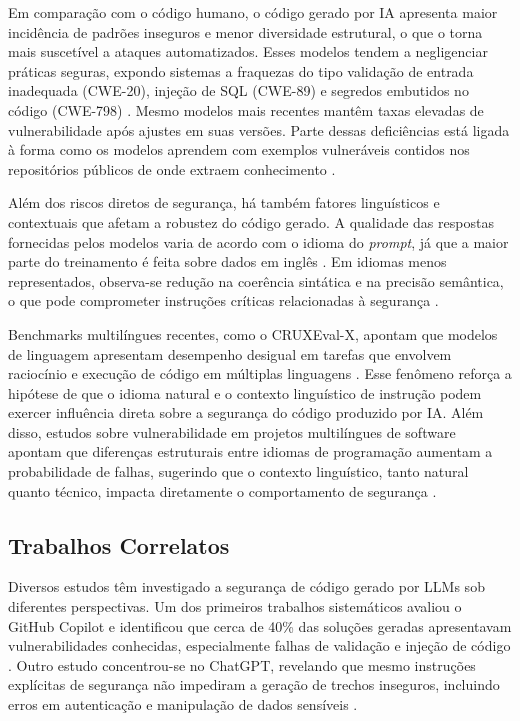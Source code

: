 \documentclass[12pt]{article}
\begin{document}
Em comparação com o código humano, o código gerado por IA apresenta maior incidência de padrões inseguros e menor diversidade estrutural, o que o torna mais suscetível a ataques automatizados. Esses modelos tendem a negligenciar práticas seguras, expondo sistemas a fraquezas do tipo validação de entrada inadequada (CWE-20), injeção de SQL (CWE-89) e segredos embutidos no código (CWE-798) \cite{cotroneo2025humanwrittenvsaigeneratedcode}. Mesmo modelos mais recentes mantêm taxas elevadas de vulnerabilidade após ajustes em suas versões. Parte dessas deficiências está ligada à forma como os modelos aprendem com exemplos vulneráveis contidos nos repositórios públicos de onde extraem conhecimento \cite{dora2025hiddenrisksllmgeneratedweb}.

Além dos riscos diretos de segurança, há também fatores linguísticos e contextuais que afetam a robustez do código gerado. A qualidade das respostas fornecidas pelos modelos varia de acordo com o idioma do \textit{prompt}, já que a maior parte do treinamento é feita sobre dados em inglês \cite{wang-etal-2024-languages}. Em idiomas menos representados, observa-se redução na coerência sintática e na precisão semântica, o que pode comprometer instruções críticas relacionadas à segurança \cite{kumar2025polyguardmultilingualsafetymoderation}.

Benchmarks multilíngues recentes, como o CRUXEval-X, apontam que modelos de linguagem apresentam desempenho desigual em tarefas que envolvem raciocínio e execução de código em múltiplas linguagens \cite{xu2025cruxevalxbenchmarkmultilingualcode}. Esse fenômeno reforça a hipótese de que o idioma natural e o contexto linguístico de instrução podem exercer influência direta sobre a segurança do código produzido por IA. Além disso, estudos sobre vulnerabilidade em projetos multilíngues de software apontam que diferenças estruturais entre idiomas de programação aumentam a probabilidade de falhas, sugerindo que o contexto linguístico, tanto natural quanto técnico, impacta diretamente o comportamento de segurança \cite{10.1145/3540250.3549173}.

\subsection{Trabalhos Correlatos}

Diversos estudos têm investigado a segurança de código gerado por LLMs sob diferentes perspectivas. Um dos primeiros trabalhos sistemáticos avaliou o GitHub Copilot e identificou que cerca de 40\% das soluções geradas apresentavam vulnerabilidades conhecidas, especialmente falhas de validação e injeção de código \cite{pearce2021asleepkeyboardassessingsecurity}. Outro estudo concentrou-se no ChatGPT, revelando que mesmo instruções explícitas de segurança não impediram a geração de trechos inseguros, incluindo erros em autenticação e manipulação de dados sensíveis \cite{khoury2023securecodegeneratedchatgpt}.
\end{document}
